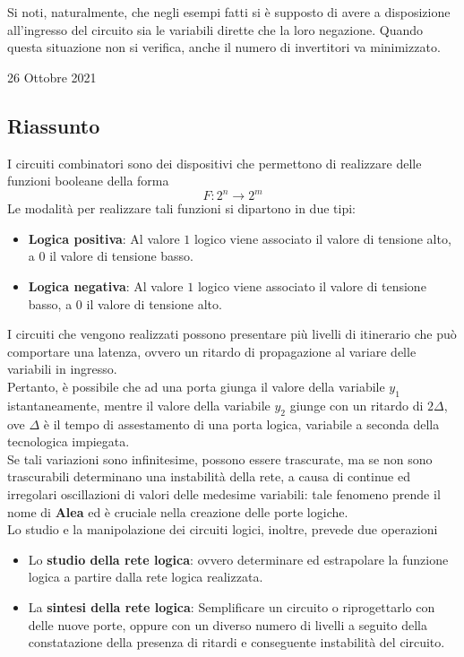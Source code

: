 \documentclass[a4paper]{extarticle}
\begin{document}
\noindent
Si noti, naturalmente, che negli esempi fatti si è supposto di avere a disposizione all’ingresso del circuito sia le variabili dirette che la loro negazione. Quando questa situazione non si verifica, anche il numero di invertitori va minimizzato.

\newpage
\begin{center}
    26 Ottobre 2021
\end{center}

\subsection{Riassunto}
I circuiti combinatori sono dei dispositivi che permettono di realizzare delle funzioni booleane della forma
\[F : 2^n \rightarrow 2^m\]
Le modalità per realizzare tali funzioni si dipartono in due tipi:
\begin{itemize}
    \item \textbf{Logica positiva}: Al valore \(1\) logico viene associato il valore di tensione alto, a \(0\) il valore di tensione basso.

    \item \textbf{Logica negativa}: Al valore \(1\) logico viene associato il valore di tensione basso, a \(0\) il valore di tensione alto.
\end{itemize}

\noindent
I circuiti che vengono realizzati possono presentare più livelli di itinerario che può comportare una latenza, ovvero un ritardo di propagazione al variare delle variabili in ingresso.\\
Pertanto, è possibile che ad una porta giunga il valore della variabile \(y_1\) istantaneamente, mentre il valore della variabile \(y_2\) giunge con un ritardo di \(2\Delta\), ove \(\Delta\) è il tempo di assestamento di una porta logica, variabile a seconda della tecnologica impiegata.\\
Se tali variazioni sono infinitesime, possono essere trascurate, ma se non sono trascurabili determinano una instabilità della rete, a causa di continue ed irregolari oscillazioni di valori delle medesime variabili: tale fenomeno prende il nome di \textbf{Alea} ed è cruciale nella creazione delle porte logiche.\\
Lo studio e la manipolazione dei circuiti logici, inoltre, prevede due operazioni
\begin{itemize}
    \item Lo \textbf{studio della rete logica}: ovvero determinare ed estrapolare la funzione logica a partire dalla rete logica realizzata.

    \item La \textbf{sintesi della rete logica}: Semplificare un circuito o riprogettarlo con delle nuove porte, oppure con un diverso numero di livelli a seguito della constatazione della presenza di ritardi e conseguente instabilità del circuito.
\end{itemize}
\end{document}
